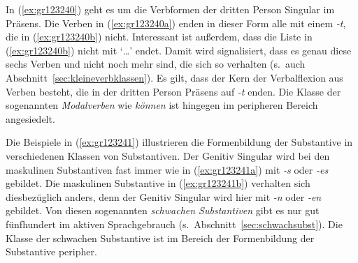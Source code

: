 
In (\ref{ex:gr123240}) geht es um die Verbformen der dritten Person Singular im Präsens.
Die Verben in (\ref{ex:gr123240a}) enden in dieser Form alle mit einem \textit{-t}, die in (\ref{ex:gr123240b}) nicht.
Interessant ist außerdem, dass die Liste in (\ref{ex:gr123240b}) nicht mit `\textit{\ldots}' endet.
Damit wird signalisiert, dass es genau diese sechs Verben und nicht noch mehr sind, die sich so verhalten (s.\ auch Abschnitt~\ref{sec:kleineverbklassen}).
Es gilt, dass der Kern der Verbalflexion aus Verben besteht, die in der dritten Person Präsens auf \textit{-t} enden.
Die Klasse der sogenannten \textit{Modalverben} wie \textit{können} ist hingegen im peripheren Bereich angesiedelt.


Die Beispiele in (\ref{ex:gr123241}) illustrieren die Formenbildung der Substantive in verschiedenen Klassen von Substantiven.
Der Genitiv Singular wird bei den maskulinen Substantiven fast immer wie in (\ref{ex:gr123241a}) mit \textit{-s} oder \textit{-es} gebildet.
Die maskulinen Substantive in (\ref{ex:gr123241b}) verhalten sich diesbezüglich anders, denn der Genitiv Singular wird hier mit \textit{-n} oder \textit{-en} gebildet.
Von diesen sogenannten \textit{schwachen Substantiven} gibt es nur gut fünfhundert im aktiven Sprachgebrauch (s.\ Abschnitt~\ref{sec:schwachsubst}).
Die Klasse der schwachen Substantive ist im Bereich der Formenbildung der Substantive peripher.



